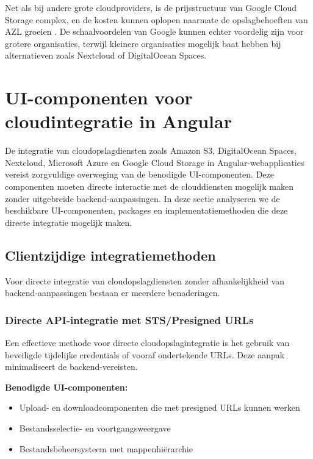 Net als bij andere grote cloudproviders, is de prijsstructuur van Google Cloud Storage complex, en de kosten kunnen oplopen naarmate de opslagbehoeften van AZL groeien \autocite{google_pricing}. De schaalvoordelen van Google kunnen echter voordelig zijn voor grotere organisaties, terwijl kleinere organisaties mogelijk baat hebben bij alternatieven zoals Nextcloud of DigitalOcean Spaces.


\section{UI-componenten voor cloudintegratie in Angular}

De integratie van cloudopslagdiensten zoals Amazon S3, DigitalOcean Spaces, Nextcloud, Microsoft Azure en Google Cloud Storage in Angular-webapplicaties vereist zorgvuldige overweging van de benodigde UI-componenten. Deze componenten moeten directe interactie met de clouddiensten mogelijk maken zonder uitgebreide backend-aanpassingen. In deze sectie analyseren we de beschikbare UI-componenten, packages en implementatiemethoden die deze directe integratie mogelijk maken.

\subsection{Clientzijdige integratiemethoden}

Voor directe integratie van cloudopslagdiensten zonder afhankelijkheid van backend-aanpassingen bestaan er meerdere benaderingen.

\subsubsection{Directe API-integratie met STS/Presigned URLs}

Een effectieve methode voor directe cloudopslagintegratie is het gebruik van beveiligde tijdelijke credentials of vooraf ondertekende URLs. Deze aanpak minimaliseert de backend-vereisten.

\textbf{Benodigde UI-componenten:}
\begin{itemize}
    \item Upload- en downloadcomponenten die met presigned URLs kunnen werken
    \item Bestandsselectie- en voortgangsweergave
    \item Bestandsbeheersysteem met mappenhiërarchie
\end{itemize}

